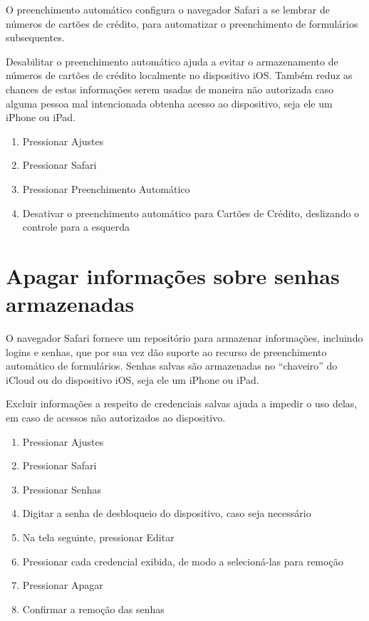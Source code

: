O preenchimento autom\'atico configura o navegador Safari a se lembrar de n\'umeros de cart\~oes de cr\'edito, para automatizar o preenchimento de formul\'arios subsequentes.

Desabilitar o preenchimento autom\'atico ajuda a evitar o armazenamento de n\'umeros de cart\~oes de cr\'edito localmente no dispositivo iOS. Tamb\'em reduz as chances de estas informa\c c\~oes serem usadas de maneira n\~ao autorizada caso alguma pessoa mal intencionada obtenha acesso ao dispositivo, seja ele um iPhone ou iPad. 

\begin{enumerate}
\item Pressionar Ajustes
\item Pressionar Safari
\item Pressionar Preenchimento Autom\'atico
\item Desativar o preenchimento autom\'atico para Cart\~oes de Cr\'edito, deslizando o controle para a esquerda
\end{enumerate}

\section{Apagar informa\c c\~oes sobre senhas armazenadas}

O navegador Safari fornece um reposit\'orio para armazenar informa\c c\~oes, incluindo logins e senhas, que por sua vez d\~ao suporte ao recurso de  preenchimento autom\'atico de formul\'arios. Senhas salvas s\~ao armazenadas no ``chaveiro'' do iCloud ou do dispositivo iOS, seja ele um iPhone ou iPad. 

Excluir informa\c c\~oes a respeito de credenciais salvas ajuda a impedir o uso delas, em caso de acessos n\~ao autorizados ao dispositivo.

\begin{enumerate}
\item Pressionar Ajustes
\item Pressionar Safari
\item Pressionar Senhas
\item Digitar a senha de desbloqueio do dispositivo, caso seja necess\'ario
\item Na tela seguinte, pressionar Editar
\item Pressionar cada credencial exibida, de modo a selecion\'a-las para remo\c c\~ao
\item Pressionar Apagar
\item Confirmar a remo\c c\~ao das senhas 
\end{enumerate}

